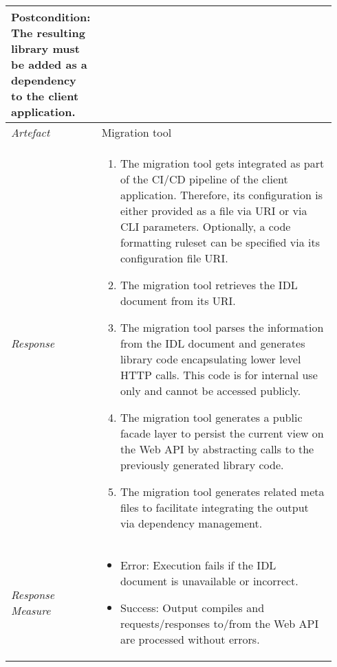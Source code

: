 \begin{center}
\begin{longtable}{ p{0.22\linewidth} p{0.72\linewidth} }
    	\textbf{Postcondition:} The resulting library must be added as a dependency to the client application.
    	\\
    \hline
    	\textit{Artefact} & Migration tool\\
    \hline
    \textit{Response} &
    \vspace{-5.1mm}
    \begin{enumerate}[itemindent=-9pt, leftmargin=14pt, itemsep=0pt, align=left]
    	\item The migration tool gets integrated as part of the CI/CD pipeline of the client application. Therefore, its configuration is either provided as a file via URI or via \ac{CLI} parameters. Optionally, a code formatting ruleset can be specified via its configuration file URI.
        \item The migration tool retrieves the IDL document from its URI.
        \item The migration tool parses the information from the IDL document and generates library code encapsulating lower level HTTP calls. This code is for internal use only and cannot be accessed publicly.
        \item The migration tool generates a public facade layer to persist the current view on the Web API by abstracting calls to the previously generated library code. 
        \item The migration tool generates related meta files to facilitate integrating the output via dependency management.
    \end{enumerate} \\ [-5mm]
    \hline
    \textit{Response Measure} &
    \vspace{-8.5mm}
    \begin{itemize}[itemindent=-9pt, leftmargin=14pt, itemsep=0pt, align=left]
       	\item Error: Execution fails if the IDL document is unavailable or incorrect.
       	\item Success: Output compiles and requests/responses to/from the Web API are processed without errors. 
        \vspace{-5mm}
    \end{itemize}\\
    \hline
    \end{longtable}
\end{center}